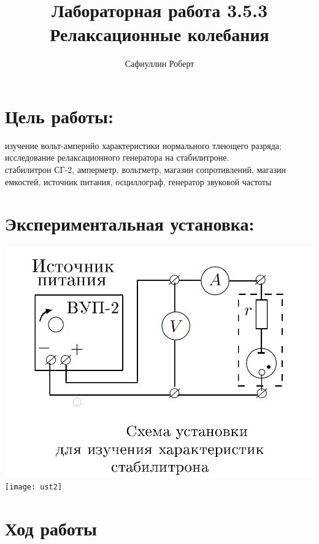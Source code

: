 \documentclass[a4paper,12pt]{article} %
\author{Сафиуллин Роберт	}
\title{Лабораторная работа 3.5.3\\ Релаксационные колебания}
\begin{document}

\maketitle


\newpage
\section{Цель работы:}
 изучение вольт-ампернйо характеристики нормального тлеющего разряда; исследование релаксационного генератора на стабилитроне.
\\
стабилитрон СГ-2, амперметр, вольтметр, магазин сопротивлений, магазин емкостей, источник питания, осциллограф, генератор звуковой частоты
 
\section{Экспериментальная установка:}
\begin{center}
\includegraphics[scale=0.3]{ust1}
\texttt{[image: ust2]}

\end{center}

\section{Ход работы}
\end{document}
